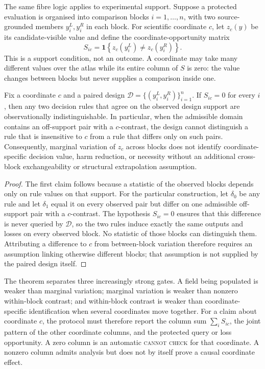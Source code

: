 The same fibre logic applies to experimental support. Suppose a protected
evaluation is organised into comparison blocks $i=1,\ldots,n$, with two
source-grounded members $y_i^L,y_i^R$ in each block. For scientific
coordinate $c$, let $z_c(y)$ be its candidate-visible value and define the
coordinate-opportunity matrix
\begin{equation}
 S_{ic}=\mathbf 1\!\left\{z_c(y_i^L)\neq z_c(y_i^R)\right\}.
 \label{eq:coordinate-opportunity}
\end{equation}
This is a support condition, not an outcome. A coordinate may take many
different values over the atlas while its entire column of $S$ is zero: the
value changes between blocks but never supplies a comparison inside one.

\begin{theorem}
\label{thm:coordinate-support}
Fix a coordinate $c$ and a paired design $\mathcal D=\{(y_i^L,y_i^R)\}_{i=1}^n$.
If $S_{ic}=0$ for every $i$, then any two decision rules that agree on the
observed design support are observationally indistinguishable. In particular,
when the admissible domain contains an off-support pair with a $c$-contrast,
the design cannot distinguish a rule that is insensitive to $c$ from a rule
that differs only on such pairs. Consequently, marginal variation of $z_c$ across blocks does
not identify coordinate-specific decision value, harm reduction, or
necessity without an additional cross-block exchangeability or structural
extrapolation assumption.
\end{theorem}

\begin{proof}
The first claim follows because a statistic of the observed blocks depends
only on rule values on that support. For the particular construction, let
$\delta_0$ be any rule and let $\delta_1$ equal it on every observed pair but
differ on one admissible off-support pair with a $c$-contrast. The hypothesis
$S_{ic}=0$ ensures that this difference is never queried by $\mathcal D$, so
the two rules induce exactly the same outputs and losses on every observed
block. No statistic of those blocks can distinguish them.
Attributing a difference to $c$ from between-block variation therefore
requires an assumption linking otherwise different blocks; that assumption
is not supplied by the paired design itself.
\end{proof}

The theorem separates three increasingly strong gates. A field being
populated is weaker than marginal variation; marginal variation is weaker
than nonzero within-block contrast; and within-block contrast is weaker than
coordinate-specific identification when several coordinates move together.
For a claim about coordinate $c$, the protocol must therefore report the
column sum $\sum_i S_{ic}$, the joint pattern of the other coordinate columns,
and the protected query or loss opportunity. A zero column is an automatic
\textsc{cannot check} for that coordinate. A nonzero column admits analysis
but does not by itself prove a causal coordinate effect.

